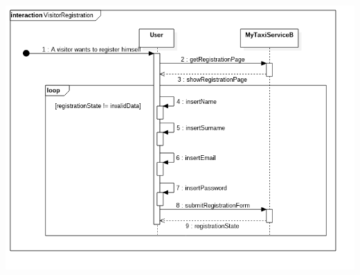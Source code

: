 \documentclass[11pt,titlepage]{article} %
\begin{document}
\begin{enumerate}
\begin{center}
		\includegraphics[scale=0.52]{usecase8.png}
		\end{center}
	

\end{enumerate}
\end{document}
